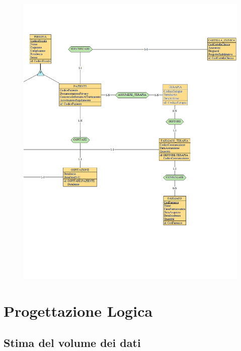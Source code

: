 \documentclass[a4paper, 12pt]{report}
\begin{document}
\begin{figure}[H]
        \centering
        \includegraphics[width=1.0\textwidth]{img/ERFinaleDX.png}
\end{figure}

\chapter{Progettazione Logica}

\section{Stima del volume dei dati}
\end{document}
